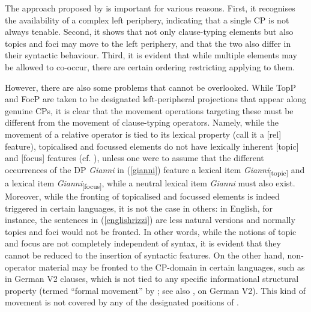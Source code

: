 The approach proposed by \citet{rizzi1997, rizzi2004} is important for various reasons. First, it recognises the availability of a complex left periphery, indicating that a single CP is not always tenable. Second, it shows that not only clause-typing elements but also topics and foci may move to the left periphery, and that the two also differ in their syntactic behaviour. Third, it is evident that while multiple elements may be allowed to co-occur, there are certain ordering restricting applying to them.

However, there are also some problems that cannot be overlooked. While TopP and FocP are taken to be designated left-peripheral projections that appear along genuine CPs, it is clear that the movement operations targeting these must be different from the movement of clause-typing operators. Namely, while the movement of a relative operator is tied to its lexical property (call it a [rel] feature), topicalised and focussed elements do not have lexically inherent [topic] and [focus] features (cf. \citealt{fanselowlenertova2011}), unless one were to assume that the different occurrences of the DP \textit{Gianni} in (\ref{gianni}) feature a lexical item \textit{Gianni}\textsubscript{[topic]} and a lexical item \textit{Gianni}\textsubscript{[focus]}, while a neutral lexical item \textit{Gianni} must also exist. Moreover, while the fronting of topicalised and focussed elements is indeed triggered in certain languages, it is not the case in others: in English, for instance, the sentences in (\ref{englishrizzi}) are less natural versions and normally topics and foci would not be fronted. In other words, while the notions of topic and focus are not completely independent of syntax, it is evident that they cannot be reduced to the insertion of syntactic features. On the other hand, non-operator material may be fronted to the CP-domain in certain languages, such as in German V2 clauses, which is not tied to any specific informational structural property (termed ``formal movement'' by \citealt{frey2004, frey2005}; see also \citealt{denbesten1989}, \citealt{fanselow2002, fanselow2004, fanselow2004isis, fanselow2009} on German V2). This kind of movement is not covered by any of the designated positions of \citet{rizzi1997, rizzi2004}.

